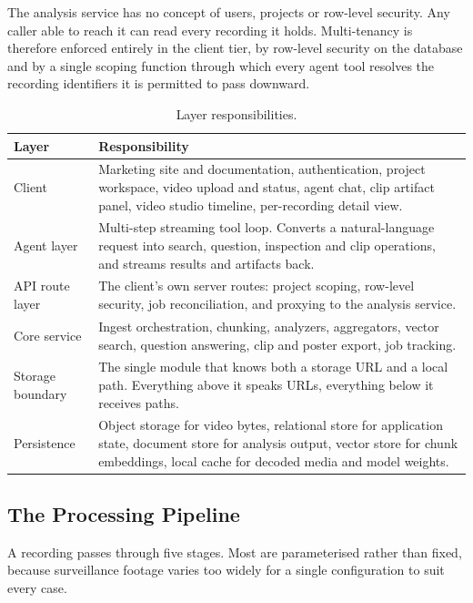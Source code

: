 \documentclass[11pt,a4paper]{article}
\begin{document}
The analysis service has no concept of users, projects or row-level security.
Any caller able to reach it can read every recording it holds. Multi-tenancy is
therefore enforced entirely in the client tier, by row-level security on the
database and by a single scoping function through which every agent tool
resolves the recording identifiers it is permitted to pass downward.

\begin{table}[htbp]
\centering
\small
\begin{tabularx}{\textwidth}{@{}L{3.0cm}X@{}}
\toprule
\textbf{Layer} & \textbf{Responsibility} \\
\midrule
Client & Marketing site and documentation, authentication, project workspace, video upload and status, agent chat, clip artifact panel, video studio timeline, per-recording detail view. \\
Agent layer & Multi-step streaming tool loop. Converts a natural-language request into search, question, inspection and clip operations, and streams results and artifacts back. \\
API route layer & The client's own server routes: project scoping, row-level security, job reconciliation, and proxying to the analysis service. \\
Core service & Ingest orchestration, chunking, analyzers, aggregators, vector search, question answering, clip and poster export, job tracking. \\
Storage boundary & The single module that knows both a storage URL and a local path. Everything above it speaks URLs, everything below it receives paths. \\
Persistence & Object storage for video bytes, relational store for application state, document store for analysis output, vector store for chunk embeddings, local cache for decoded media and model weights. \\
\bottomrule
\end{tabularx}
\caption{Layer responsibilities.}
\end{table}

\subsection{The Processing Pipeline}

A recording passes through five stages. Most are parameterised rather than
fixed, because surveillance footage varies too widely for a single configuration
to suit every case.
\end{document}
